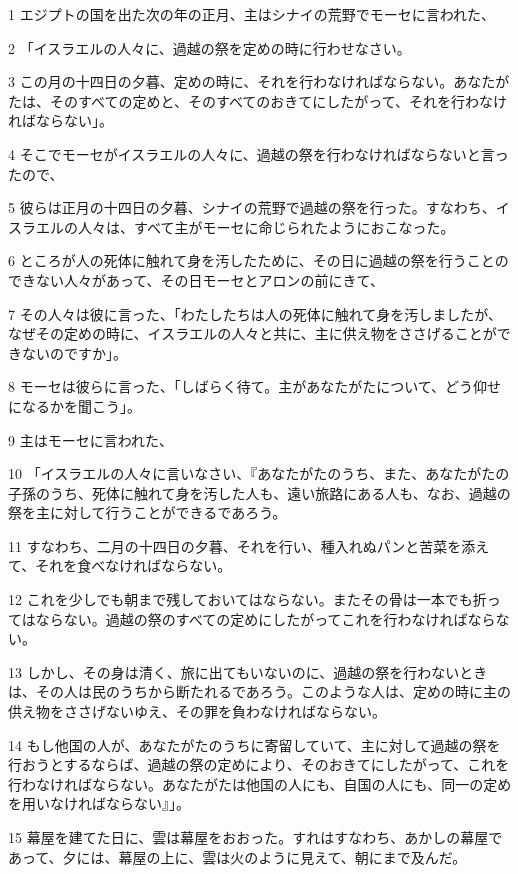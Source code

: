 \par 1 エジプトの国を出た次の年の正月、主はシナイの荒野でモーセに言われた、
\par 2 「イスラエルの人々に、過越の祭を定めの時に行わせなさい。
\par 3 この月の十四日の夕暮、定めの時に、それを行わなければならない。あなたがたは、そのすべての定めと、そのすべてのおきてにしたがって、それを行わなければならない」。
\par 4 そこでモーセがイスラエルの人々に、過越の祭を行わなければならないと言ったので、
\par 5 彼らは正月の十四日の夕暮、シナイの荒野で過越の祭を行った。すなわち、イスラエルの人々は、すべて主がモーセに命じられたようにおこなった。
\par 6 ところが人の死体に触れて身を汚したために、その日に過越の祭を行うことのできない人々があって、その日モーセとアロンの前にきて、
\par 7 その人々は彼に言った、「わたしたちは人の死体に触れて身を汚しましたが、なぜその定めの時に、イスラエルの人々と共に、主に供え物をささげることができないのですか」。
\par 8 モーセは彼らに言った、「しばらく待て。主があなたがたについて、どう仰せになるかを聞こう」。
\par 9 主はモーセに言われた、
\par 10 「イスラエルの人々に言いなさい、『あなたがたのうち、また、あなたがたの子孫のうち、死体に触れて身を汚した人も、遠い旅路にある人も、なお、過越の祭を主に対して行うことができるであろう。
\par 11 すなわち、二月の十四日の夕暮、それを行い、種入れぬパンと苦菜を添えて、それを食べなければならない。
\par 12 これを少しでも朝まで残しておいてはならない。またその骨は一本でも折ってはならない。過越の祭のすべての定めにしたがってこれを行わなければならない。
\par 13 しかし、その身は清く、旅に出てもいないのに、過越の祭を行わないときは、その人は民のうちから断たれるであろう。このような人は、定めの時に主の供え物をささげないゆえ、その罪を負わなければならない。
\par 14 もし他国の人が、あなたがたのうちに寄留していて、主に対して過越の祭を行おうとするならば、過越の祭の定めにより、そのおきてにしたがって、これを行わなければならない。あなたがたは他国の人にも、自国の人にも、同一の定めを用いなければならない』」。
\par 15 幕屋を建てた日に、雲は幕屋をおおった。すれはすなわち、あかしの幕屋であって、夕には、幕屋の上に、雲は火のように見えて、朝にまで及んだ。
